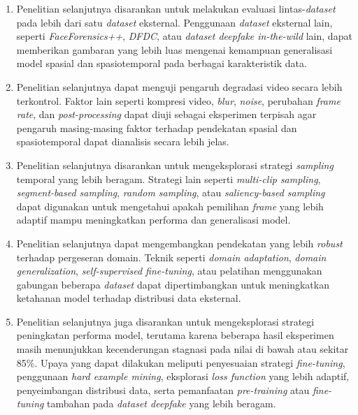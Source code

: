 \begin{enumerate}[noitemsep]
	\item Penelitian selanjutnya disarankan untuk melakukan evaluasi lintas-\textit{dataset} pada lebih dari satu \textit{dataset} eksternal. Penggunaan \textit{dataset} eksternal lain, seperti \textit{FaceForensics++}, \textit{DFDC}, atau \textit{dataset deepfake in-the-wild} lain, dapat memberikan gambaran yang lebih luas mengenai kemampuan generalisasi model spasial dan spasiotemporal pada berbagai karakteristik data.
	\item Penelitian selanjutnya dapat menguji pengaruh degradasi video secara lebih terkontrol. Faktor lain seperti kompresi video, \textit{blur}, \textit{noise}, perubahan \textit{frame rate}, dan \textit{post-processing} dapat diuji sebagai eksperimen terpisah agar pengaruh masing-masing faktor terhadap pendekatan spasial dan spasiotemporal dapat dianalisis secara lebih jelas.
	\item Penelitian selanjutnya disarankan untuk mengeksplorasi strategi \textit{sampling} temporal yang lebih beragam. Strategi lain seperti \textit{multi-clip sampling}, \textit{segment-based sampling}, \textit{random sampling}, atau \textit{saliency-based sampling} dapat digunakan untuk mengetahui apakah pemilihan \textit{frame} yang lebih adaptif mampu meningkatkan performa dan generalisasi model.
	\item Penelitian selanjutnya dapat mengembangkan pendekatan yang lebih \textit{robust} terhadap pergeseran domain. Teknik seperti \textit{domain adaptation}, \textit{domain generalization}, \textit{self-supervised fine-tuning}, atau pelatihan menggunakan gabungan beberapa \textit{dataset} dapat dipertimbangkan untuk meningkatkan ketahanan model terhadap distribusi data eksternal.
	\item Penelitian selanjutnya juga disarankan untuk mengeksplorasi strategi peningkatan performa model, terutama karena beberapa hasil eksperimen masih menunjukkan kecenderungan stagnasi pada nilai di bawah atau sekitar 85\%. Upaya yang dapat dilakukan meliputi penyesuaian strategi \textit{fine-tuning}, penggunaan \textit{hard example mining}, eksplorasi \textit{loss function} yang lebih adaptif, penyeimbangan distribusi data, serta pemanfaatan \textit{pre-training} atau \textit{fine-tuning} tambahan pada \textit{dataset deepfake} yang lebih beragam.
\end{enumerate}
